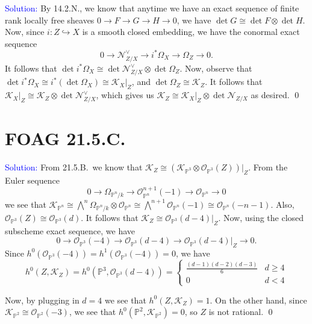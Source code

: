 \documentclass[11pt]{article}
\newcommand{\PP}{\mathbb{P}}
\newcommand{\cK}{\mathcal{K}}
\newcommand{\cN}{\mathcal{N}}
\newcommand{\cO}{\mathcal{O}}
\newenvironment{solution}{\begin{trivlist}\item[]{\textcolor{blue}{Solution:}}}{\qed \end{trivlist}}
\begin{document}
\begin{solution}
    By 14.2.N., we know that anytime we have an exact sequence of finite rank locally free sheaves $0 \rightarrow F \rightarrow G \rightarrow H \rightarrow 0$, we have $\det G \cong \det F \otimes \det H$. Now, since $i: Z \hookrightarrow X$ is a smooth closed embedding, we have the conormal exact sequence 
    \[
        0 \longrightarrow \cN_{Z/X}^\vee \longrightarrow i^* \Omega_{X} \longrightarrow \Omega_Z \longrightarrow 0.
    \]
    It follows that $\det i^* \Omega_{X} \cong \det \cN_{Z/X}^\vee \otimes \det \Omega_Z$. Now, observe that $\det i^* \Omega_X \cong i^* (\det \Omega_X) \cong \cK_X |_Z$, and $\det \Omega_Z \cong \cK_Z$. It follows that $\cK_X|_Z \cong \cK_Z \otimes \det \cN_{Z/X}^\vee$, which gives us $\cK_Z \cong \cK_X|_Z \otimes \det \cN_{Z/X}$ as desired. 
\end{solution}

\newpage

\section*{FOAG 21.5.C.}

\begin{solution}
    From 21.5.B.\ we know that $\cK_Z \cong (\cK_{\PP^3} \otimes \cO_{\PP^3}(Z))|_Z$. From the Euler sequence 
    \[
        0 \longrightarrow \Omega_{\PP^n/k} \longrightarrow \cO^{n+1}_{\PP^n}(-1) \longrightarrow \cO_{\PP^n} \longrightarrow 0
    \]
    we see that $\cK_{\PP^n} \cong \bigwedge^n \Omega_{\PP^n/k} \otimes \cO_{\PP^n} \cong \bigwedge^{n+1} \cO_{\PP^n}(-1) \cong \cO_{\PP^n}(-n-1)$. Also, $\cO_{\PP^3}(Z) \cong \cO_{\PP^3}(d)$. It follows that $\cK_Z \cong \cO_{\PP^3}(d-4)|_Z$. Now, using the closed subscheme exact sequence, we have
    \[
        0 \longrightarrow \cO_{\PP^3}(-4) 
        \longrightarrow \cO_{\PP^3}(d-4) 
        \longrightarrow \cO_{\PP^3}(d-4)|_Z 
        \longrightarrow 0.
    \]
    Since $h^0(\cO_{\PP^3}(-4)) = h^1(\cO_{\PP^3}(-4)) = 0$, we have 
    \begin{equation*}
        h^0(Z, \cK_Z) = h^0(\PP^3, \cO_{\PP^3}(d-4)) = 
        \begin{cases}
            \frac{(d-1)(d-2)(d-3)}{6} & d \geq 4 \\
            0 & d < 4
        \end{cases}
    \end{equation*}

    Now, by plugging in $d = 4$ we see that $h^0(Z, \cK_Z) = 1$. On the other hand, since $\cK_{\PP^2} \cong \cO_{\PP^2}(-3)$, we see that $h^0(\PP^2, \cK_{\PP^2}) = 0$, so $Z$ is not rational. 
\end{solution}
\end{document}
